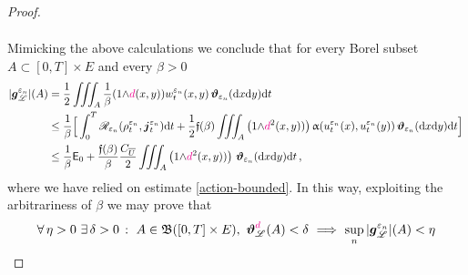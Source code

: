\documentclass[11pt,reqno]{amsart}
\numberwithin{equation}{section}
\newcommand{\scrL}{\mathscr{L}}
\newcommand{\eps}{\varepsilon}
\newcommand{\dd}{\mathrm{d}}
\theoremstyle{definition}
\newcommand{\ep}{\varepsilon}
\let\eps\ep
\def\dd{\mathrm{d}}
\newcommand{\teta}{\boldsymbol \vartheta}
\newcommand{\tetapi}{\boldsymbol{\teta}_{\kappa}}
\newcommand{\tetapien}{\boldsymbol{\teta}_{\eps_n}}
\newcommand{\Lebone}{\scrL}
\newcommand{\bj}{{\boldsymbol j}}
\newcommand{\scrR}{\mathscr{R}}
\newcommand{\bg}{{\boldsymbol{g}}}
\newcommand{\ej}{\eps_n}
\newcommand{\psih}{\mathfrak{f}}%
\newcommand{\RNEW}{\color{black}} %
\newcommand{\EEE}{\color{black}}
\newcommand{\dpi}{{\color{magenta} d}}
\numberwithin{equation}{section}
\begin{document}
\begin{proof}
\begin{equation}
\begin{aligned}
    \end{aligned}
  \end{equation}
 \par
    Mimicking the above calculations we conclude that 
    for every Borel subset \RNEW $A \subset [0,T]\times E$  \EEE and every $\beta>0$
    \[
    \begin{aligned}
|\bg_{\Lebone}^{\ej}|(A)  & =  \RNEW \frac12 \EEE    \iiint_{A} \frac1\beta (1{\wedge}\dpi(x,y)) w_t^{\ej}(x,y)\,\tetapien(\dd x \dd y ) \dd t 
\\
& \leq \frac1\beta 
       \Big[
\int_0^T \scrR_{\ej} (\rho_t^{\ej}, \bj_t^{\ej}) \dd t 
+ \RNEW \frac12 \EEE\psih(\beta)    \iiint_{A}   \left( 1{\wedge}\dpi^2(x,y)) \right) \upalpha(u_t^{\ej}(x), u_t^{\ej}(y)) \,\tetapien(\dd x \dd y )  \dd t
\Big]\,
\\
& \leq \frac1\beta \mathsf{E}_0
+ \frac{\psih(\beta)}\beta  \frac{C_{\overline{U}}}2  \iiint_{A}
  \left( 1{\wedge}\dpi^2(x,y)) \right)\,\tetapien(\dd x \dd y ) \dd t \,,
  \end{aligned}
    \]
    where we have 
     relied on estimate \eqref{action-bounded}.
   In this way, exploiting the arbitrariness of $\beta$  we may prove that 
   \begin{equation}
   \label{for-setwise-convergence}
   \forall\, \eta>0 \ \exists\, \delta>0 \, : \ \RNEW A \in \mathfrak{B}([0,T]\times E), \EEE \ \teta_\Lebone^{\dpi}  (A)<\delta \ \Longrightarrow \ \sup_n |\bg_{\Lebone}^{\ej}|(A) <\eta

\end{equation}
\end{proof}
\end{document}

